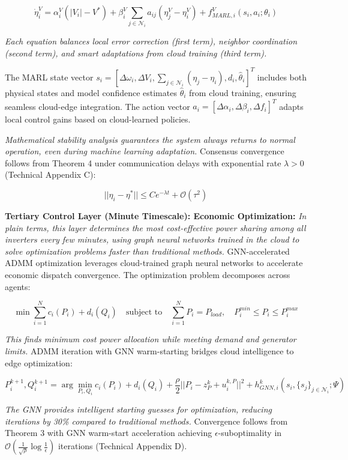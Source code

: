 \documentclass[12pt]{article}
\begin{document}
$$\dot{\eta}_i^{V} = \alpha_i^{V}(|V_i| - V^*) + \beta_i^{V} \sum_{j \in \mathcal{N}_i} a_{ij}(\eta_j^{V} - \eta_i^{V}) + f_{MARL,i}^{V}(s_i, a_i; \theta_i)$$

\textit{Each equation balances local error correction (first term), neighbor coordination (second term), and smart adaptations from cloud training (third term).}

The MARL state vector $s_i = [\Delta\omega_i, \Delta V_i, \sum_{j \in \mathcal{N}_i}(\eta_j - \eta_i), d_i, \hat{\theta}_i]^T$ includes both physical states and model confidence estimates $\hat{\theta}_i$ from cloud training, ensuring seamless cloud-edge integration. The action vector $a_i = [\Delta\alpha_i, \Delta\beta_i, \Delta f_i]^T$ adapts local control gains based on cloud-learned policies.

\textit{Mathematical stability analysis guarantees the system always returns to normal operation, even during machine learning adaptation.} Consensus convergence follows from Theorem 4 under communication delays with exponential rate $\lambda > 0$ (Technical Appendix C):

$$||\eta_i - \eta^*|| \leq Ce^{-\lambda t} + \mathcal{O}(\tau^2)$$

\textbf{Tertiary Control Layer (Minute Timescale): Economic Optimization:} \textit{In plain terms, this layer determines the most cost-effective power sharing among all inverters every few minutes, using graph neural networks trained in the cloud to solve optimization problems faster than traditional methods.} GNN-accelerated ADMM optimization leverages cloud-trained graph neural networks to accelerate economic dispatch convergence. The optimization problem decomposes across agents:

$$\min \sum_{i=1}^N c_i(P_i) + d_i(Q_i) \quad \text{subject to} \quad \sum_{i=1}^N P_i = P_{load}, \quad P_i^{min} \leq P_i \leq P_i^{max}$$

\textit{This finds minimum cost power allocation while meeting demand and generator limits.} ADMM iteration with GNN warm-starting bridges cloud intelligence to edge optimization:

$$P_i^{k+1}, Q_i^{k+1} = \arg\min_{P_i,Q_i} c_i(P_i) + d_i(Q_i) + \frac{\rho}{2}||P_i - z_P^k + u_i^{k,P}||^2 + h_{GNN,i}^k(s_i, \{s_j\}_{j \in \mathcal{N}_i}; \Psi)$$

\textit{The GNN provides intelligent starting guesses for optimization, reducing iterations by 30\% compared to traditional methods.} Convergence follows from Theorem 3 with GNN warm-start acceleration achieving $\epsilon$-suboptimality in $\mathcal{O}(\frac{1}{\sqrt{\rho}} \log\frac{1}{\epsilon})$ iterations (Technical Appendix D).
\end{document}
